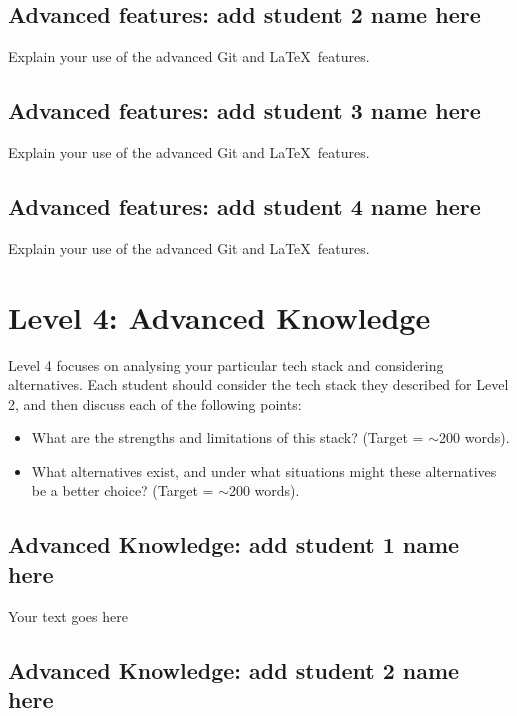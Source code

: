 \documentclass[a4paper, 11pt]{report}
\begin{document}
\subsection{Advanced features: add student 2 name here}

Explain your use of the advanced Git and \LaTeX\ features. 

\subsection{Advanced features: add student 3 name here}

Explain your use of the advanced Git and \LaTeX\ features. 

\subsection{Advanced features: add student 4 name here}

Explain your use of the advanced Git and \LaTeX\ features. 




\newpage
\section{Level 4: Advanced Knowledge}

Level 4 focuses on analysing your particular tech stack and considering alternatives. Each student should consider the tech stack they described for Level 2, and then discuss each of the following points:
\begin{itemize}
    \item What are the strengths and limitations of this stack? (Target = $\sim$200 words).
    \item What alternatives exist, and under what situations might these alternatives be a better choice? (Target = $\sim$200 words).
\end{itemize}

\subsection{Advanced Knowledge: add student 1 name here}

Your text goes here

\subsection{Advanced Knowledge: add student 2 name here}
\end{document}
